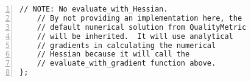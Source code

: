 \documentclass{article}
\begin{document}
\begin{lstlisting}[numbers=left,caption={Numerical \texttt{QualityMetric} Wrapper},label={lst:numerical}]
    // NOTE: No evaluate_with_Hessian.  
    // By not providing an implementation here, the 
    // default numerical solution from QualityMetric 
    // will be inherited.  It will use analytical 
    // gradients in calculating the numerical 
    // Hessian because it will call the
    // evaluate_with_gradient function above.
};
\end{lstlisting}
\end{document}
